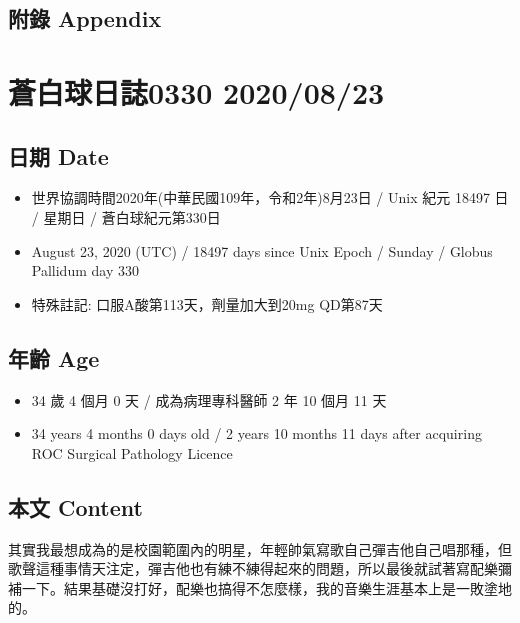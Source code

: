 \documentclass[a5paper, 11pt
]{book}
\providecommand{\tightlist}{%
  \setlength{\itemsep}{0pt}\setlength{\parskip}{0pt}}
\begin{document}
\hypertarget{ux9644ux9304-appendix-82}{%
\subsection{附錄 Appendix}\label{ux9644ux9304-appendix-82}}

\hypertarget{ux84bcux767dux7403ux65e5ux8a8c0330-20200823}{%
\section{蒼白球日誌0330
2020/08/23}\label{ux84bcux767dux7403ux65e5ux8a8c0330-20200823}}

\hypertarget{ux65e5ux671f-date-83}{%
\subsection{日期 Date}\label{ux65e5ux671f-date-83}}

\begin{itemize}
\tightlist
\item
  世界協調時間2020年(中華民國109年，令和2年)8月23日 / Unix 紀元 18497 日
  / 星期日 / 蒼白球紀元第330日
\item
  August 23, 2020 (UTC) / 18497 days since Unix Epoch / Sunday / Globus
  Pallidum day 330
\item
  特殊註記: 口服A酸第113天，劑量加大到20mg QD第87天
\end{itemize}

\hypertarget{ux5e74ux9f61-age-83}{%
\subsection{年齡 Age}\label{ux5e74ux9f61-age-83}}

\begin{itemize}
\tightlist
\item
  34 歲 4 個月 0 天 / 成為病理專科醫師 2 年 10 個月 11 天
\item
  34 years 4 months 0 days old / 2 years 10 months 11 days after
  acquiring ROC Surgical Pathology Licence
\end{itemize}

\hypertarget{ux672cux6587-content-83}{%
\subsection{本文 Content}\label{ux672cux6587-content-83}}

其實我最想成為的是校園範圍內的明星，年輕帥氣寫歌自己彈吉他自己唱那種，但歌聲這種事情天注定，彈吉他也有練不練得起來的問題，所以最後就試著寫配樂彌補一下。結果基礎沒打好，配樂也搞得不怎麼樣，我的音樂生涯基本上是一敗塗地的。
\end{document}
